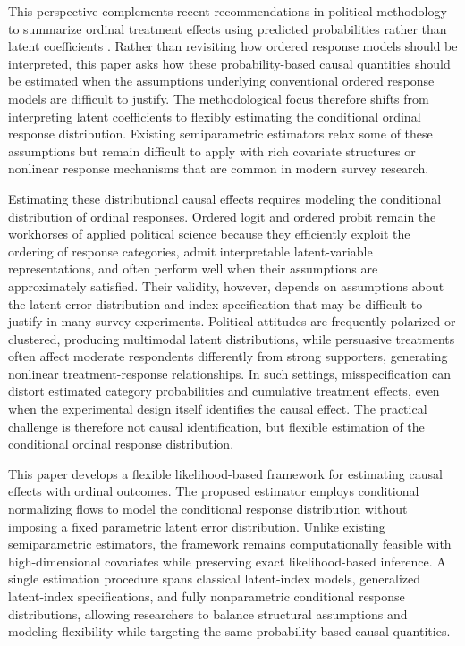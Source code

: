 \documentclass{article}
\begin{document}
This perspective complements recent recommendations in political methodology to summarize ordinal treatment effects using predicted probabilities rather than latent coefficients \citep{Hanmer2013a}. Rather than revisiting how ordered response models should be interpreted, this paper asks how these probability-based causal quantities should be estimated when the assumptions underlying conventional ordered response models are difficult to justify. The methodological focus therefore shifts from interpreting latent coefficients to flexibly estimating the conditional ordinal response distribution. Existing semiparametric estimators relax some of these assumptions but remain difficult to apply with rich covariate structures or nonlinear response mechanisms that are common in modern survey research.

Estimating these distributional causal effects requires modeling the conditional distribution of ordinal responses. Ordered logit and ordered probit remain the workhorses of applied political science because they efficiently exploit the ordering of response categories, admit interpretable latent-variable representations, and often perform well when their assumptions are approximately satisfied. Their validity, however, depends on assumptions about the latent error distribution and index specification that may be difficult to justify in many survey experiments. Political attitudes are frequently polarized or clustered, producing multimodal latent distributions, while persuasive treatments often affect moderate respondents differently from strong supporters, generating nonlinear treatment-response relationships. In such settings, misspecification can distort estimated category probabilities and cumulative treatment effects, even when the experimental design itself identifies the causal effect. The practical challenge is therefore not causal identification, but flexible estimation of the conditional ordinal response distribution.

This paper develops a flexible likelihood-based framework for estimating causal effects with ordinal outcomes. The proposed estimator employs conditional normalizing flows to model the conditional response distribution without imposing a fixed parametric latent error distribution. Unlike existing semiparametric estimators, the framework remains computationally feasible with high-dimensional covariates while preserving exact likelihood-based inference. A single estimation procedure spans classical latent-index models, generalized latent-index specifications, and fully nonparametric conditional response distributions, allowing researchers to balance structural assumptions and modeling flexibility while targeting the same probability-based causal quantities.
\end{document}
